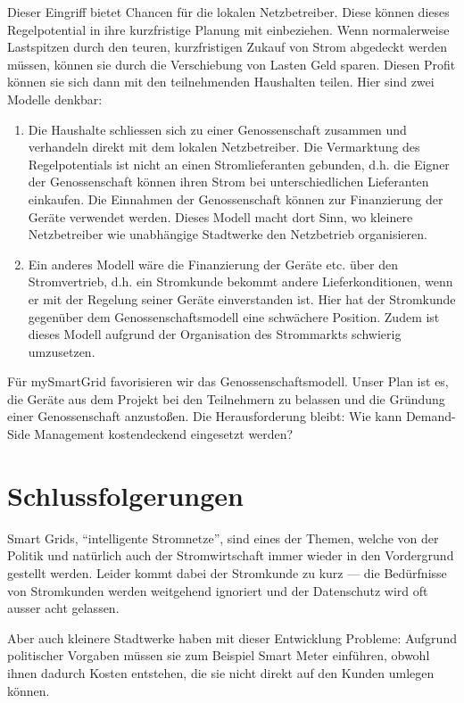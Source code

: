 \documentclass[12pt,BCOR=8.5mm]{scrartcl}
\begin{document}
Dieser Eingriff bietet Chancen für die lokalen Netzbetreiber. Diese
können dieses Regelpotential in ihre kurzfristige Planung mit
einbeziehen. Wenn normalerweise Lastspitzen durch den teuren,
kurzfristigen Zukauf von Strom abgedeckt werden müssen, können sie durch
die Verschiebung von Lasten Geld sparen. Diesen Profit können sie sich
dann mit den teilnehmenden Haushalten teilen. Hier sind zwei Modelle denkbar: 
\begin{enumerate}
  \item Die Haushalte schliessen sich zu einer Genossenschaft zusammen
    und verhandeln direkt mit dem lokalen Netzbetreiber. Die Vermarktung
    des Regelpotentials ist nicht an einen Stromlieferanten gebunden,
    d.h. die Eigner der Genossenschaft können ihren Strom bei
    unterschiedlichen Lieferanten einkaufen. Die Einnahmen der
    Genossenschaft können zur Finanzierung der Geräte verwendet werden.
    Dieses Modell macht dort Sinn, wo kleinere Netzbetreiber wie
    unabhängige Stadtwerke den Netzbetrieb organisieren.
  \item Ein anderes Modell wäre die Finanzierung der Geräte etc. über
    den Stromvertrieb, d.h. ein Stromkunde bekommt andere
    Lieferkonditionen, wenn er mit der Regelung seiner Geräte
    einverstanden ist. Hier hat der Stromkunde gegenüber dem
    Genossenschaftsmodell eine schwächere Position. Zudem ist dieses
    Modell aufgrund der Organisation des Strommarkts schwierig
    umzusetzen.
\end{enumerate}

Für mySmartGrid favorisieren wir das Genossenschaftsmodell. Unser Plan
ist es, die Geräte aus dem Projekt bei den Teilnehmern zu belassen und
die Gründung einer Genossenschaft anzustoßen. Die Herausforderung
bleibt: Wie kann Demand-Side Management kostendeckend eingesetzt werden?

\section{Schlussfolgerungen}
Smart Grids, "`intelligente Stromnetze"', sind eines der Themen, welche
von der Politik und natürlich auch der Stromwirtschaft immer wieder in
den Vordergrund gestellt werden. Leider kommt dabei der Stromkunde zu
kurz --- die Bedürfnisse von Stromkunden werden weitgehend ignoriert und
der Datenschutz wird oft ausser acht gelassen.

Aber auch kleinere Stadtwerke haben mit dieser Entwicklung Probleme:
Aufgrund politischer Vorgaben müssen sie zum Beispiel Smart Meter
einführen, obwohl ihnen dadurch Kosten entstehen, die sie nicht direkt
auf den Kunden umlegen können. 
\end{document}
